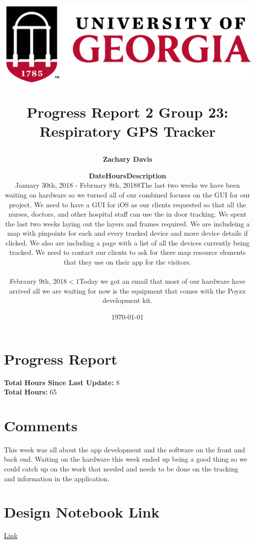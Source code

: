 \documentclass[11pt]{report}
\title{
	\begin{center}
		\includegraphics[scale=0.5]{uga.PNG}\\
 	\end{center}
 	Progress Report 2
\bigbreak Group 23: Respiratory GPS Tracker
}
\author{\textbf{Zachary Davis}}
\date{\today}
\begin{document}
\maketitle

\section*{Progress Report}
	\begin{center}
		\author{
		{\normalsize
		\begin{tabular}{m{4cm} m{2cm} m{10cm}}
		\textbf{Date} & \textbf{Hours} & \textbf{Description}\\
		\hline
		January 30th, 2018 - February 8th, 2018 & $8$ & The last two weeks we have been waiting on hardware so we turned all of our combined focuses on the GUI for our project. We need to have a GUI for iOS as our clients requested so that all the nurses, doctors, and other hospital staff can use the in door tracking. We spent the last two weeks laying out the layers and frames required. We are includeing a map with pinpoints for each and every tracked device and more device details if clicked. We also are including a page with a list of all the devices currently being tracked.  We need to contact our clients to ask for there map resource elements that they use on their app for the visitors.\\
		&&\\
		Febraury 9th, 2018 & $<1$ & Today we got an email that most of our hardware have arrived all we are waiting for now is the equipment that comes with the Poyzx development kit.\\
		\end{tabular}
		}
		}
	\end{center}
		\textbf{Total Hours Since Last Update: } 8\\
		\textbf{Total Hours: } 65

\section*{Comments}
	\paragraph*{}
		This week was all about the app development and the software on the front and back end. Waiting on the hardware this week ended up being a good thing so we could catch up on the work that needed and needs to be done on the tracking and information in the application.

\section*{Design Notebook Link}
	\begin{center}
		\href{https://docs.google.com/document/d/1_15R62LK1jZ8SYRuCrb-5IObISIdbLSfoH2bRU7464c/edit?usp=sharing}{Link}
	\end{center}
\end{document}
